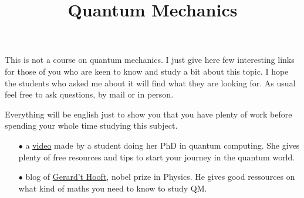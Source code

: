\documentclass[10pt,twoside]{article}
\begin{document}
\title{Quantum Mechanics }


\maketitle

This is not a course on quantum mechanics. I just give here few interesting links for those of you who are keen to know and study a bit about this topic. I hope the students who asked me about it will find what they are looking for. As usual feel free to ask questions, by mail or in person.\par

\medskip

Everything will be english just to show you that you have plenty of work before spending your whole time studying this subject.

\bigskip

\begin{itemize}
  \item[$\bullet$] a \href{https://youtu.be/Rs572Cf4zkk}{video} made by a student doing her PhD in quantum computing. She gives plenty of free resources and tips to start your journey in the quantum world.
  \item[$\bullet$] blog of \href{https://webspace.science.uu.nl/~gadda001/goodtheorist/qmech.html}{Gerard't Hooft}, nobel prize in Physics. He gives good ressources on what kind of maths you need to know to study QM.
\end{itemize}
\end{document}

